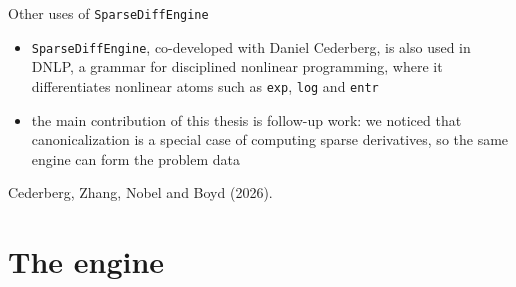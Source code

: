 \documentclass[10pt,mathserif,aspectratio=169]{beamer}
\newcommand{\bul}{\setlength\itemsep{1.1ex}}
\newcommand{\sde}{\texttt{SparseDiffEngine}}
\begin{document}
\begin{frame}[label=bk-dnlp]{Other uses of \sde{}}
\vspace{-0.5ex}
\begin{itemize}\small\bul
  \item \sde{}, co-developed with Daniel Cederberg, is also used in DNLP, a grammar for
        disciplined nonlinear programming, where it differentiates nonlinear atoms such as
        \texttt{exp}, \texttt{log} and \texttt{entr}
  \item the main contribution of this thesis is follow-up work: we noticed that
        {\color{polyblue}canonicalization is a special case of computing sparse derivatives},
        so the same engine can form the problem data
\end{itemize}

\vfill
{\scriptsize\color{black!55} Cederberg, Zhang, Nobel and Boyd (2026).}
\end{frame}

\section{The engine}
\end{document}

